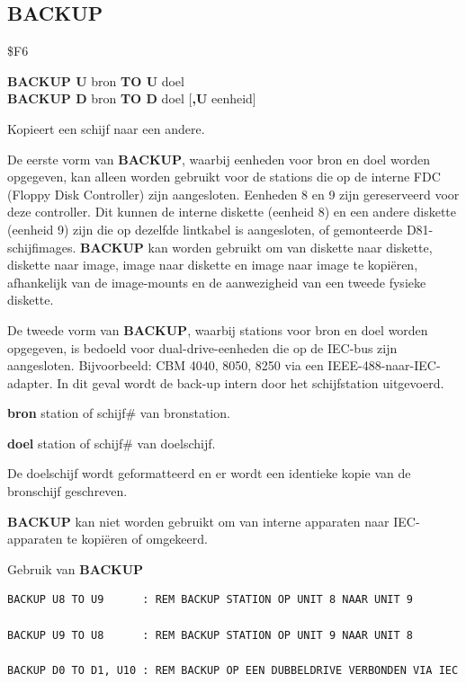 \subsection{BACKUP}
\begin{description}[leftmargin=2cm,style=nextline]
\item [Token:]    \$F6

\item [Formaat:]   {\bf BACKUP U} bron {\bf TO U} doel \\                 {\bf BACKUP D} bron {\bf TO D} doel [{\bf,U} eenheid]

\item [Gebruik:]    Kopieert een schijf naar een andere.

                  De eerste vorm van {\bf BACKUP}, waarbij eenheden voor bron en doel worden opgegeven, kan alleen worden gebruikt voor de stations die op de interne FDC (Floppy Disk Controller) zijn aangesloten. Eenheden 8 en 9 zijn gereserveerd voor deze controller. Dit kunnen de interne diskette (eenheid 8) en een andere diskette (eenheid 9) zijn die op dezelfde lintkabel is aangesloten, of gemonteerde D81-schijfimages. {\bf BACKUP} kan worden gebruikt om van diskette naar diskette, diskette naar image, image naar diskette en image naar image te kopiëren, afhankelijk van de image-mounts en de aanwezigheid van een tweede fysieke diskette.

                  De tweede vorm van {\bf BACKUP}, waarbij stations voor bron en doel worden opgegeven, is bedoeld voor dual-drive-eenheden die op de IEC-bus zijn aangesloten. Bijvoorbeeld: CBM 4040, 8050, 8250 via een IEEE-488-naar-IEC-adapter. In dit geval wordt de back-up intern door het schijfstation uitgevoerd.

                  {\bf bron} station of schijf\# van bronstation.

                  {\bf doel} station of schijf\# van doelschijf.

\item [Opmerkingen:]  De doelschijf wordt geformatteerd en er wordt een identieke kopie van de bronschijf geschreven.

                  {\bf BACKUP} kan niet worden gebruikt om van interne apparaten naar IEC-apparaten te kopiëren of omgekeerd.

\item [Voorbeelden:] Gebruik van {\bf BACKUP}

\begin{tcolorbox}[colback=black,coltext=white]
\verbatimfont{\codefont}
\begin{verbatim}
BACKUP U8 TO U9      : REM BACKUP STATION OP UNIT 8 NAAR UNIT 9

BACKUP U9 TO U8      : REM BACKUP STATION OP UNIT 9 NAAR UNIT 8

BACKUP D0 TO D1, U10 : REM BACKUP OP EEN DUBBELDRIVE VERBONDEN VIA IEC
\end{verbatim}
\end{tcolorbox}
\end{description}

